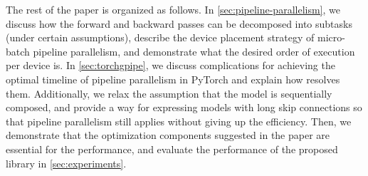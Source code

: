The rest of the paper is organized as follows.
In \autoref{sec:pipeline-parallelism}, we discuss how the forward and backward passes can be decomposed into subtasks (under certain assumptions), describe the device placement strategy of micro-batch pipeline parallelism, and demonstrate what the desired order of execution per device is. In \autoref{sec:torchgpipe}, we discuss complications for achieving the optimal timeline of pipeline parallelism in PyTorch and explain how {\torchgpipe} resolves them. Additionally, we relax the assumption that the model is sequentially composed, and provide a way for expressing models with long skip connections so that pipeline parallelism still applies without giving up the efficiency. Then, we demonstrate that the optimization components suggested in the paper are essential for the performance, and evaluate the performance of the proposed library in \autoref{sec:experiments}.
